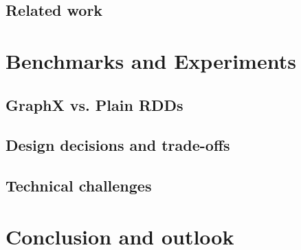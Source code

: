 \documentclass[
        a4paper,     %
        titlepage,   %
        oneside,     %
        parskip      %
        ]{scrartcl}  %
\begin{document}
    \subsection{Related work}
    \pagebreak

  \section{Benchmarks and Experiments}
    \subsection{GraphX vs. Plain RDDs}
    \subsection{Design decisions and trade-offs}
    \subsection{Technical challenges}
    \pagebreak

  \section{Conclusion and outlook}

  \clearpage
  
\end{document}
